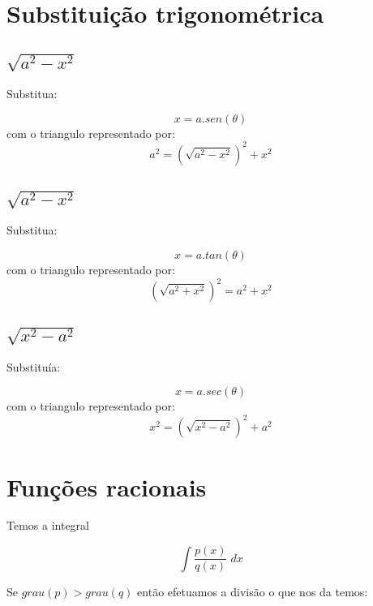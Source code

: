 \documentclass[14pt]{extreport}
\theoremstyle{definition}
\begin{document}
\section{Substituição trigonométrica}

\subsection{\(\sqrt{a^2 - x^2}\)}
Substitua:

\begin{equation}
    x = a.sen(\theta)
\end{equation}
com o triangulo representado por:
\begin{equation}
    a^2 = (\sqrt{a^2 - x^2})^2 + x^2
\end{equation}

\subsection{\(\sqrt{a^2 - x^2}\)}
Substitua:

\begin{equation}
    x = a.tan(\theta)
\end{equation}
com o triangulo representado por:
\begin{equation}
    (\sqrt{a^2 + x^2})^2 = a^2 + x^2
\end{equation}

\subsection{\(\sqrt{x^2 - a^2}\)}
Substituía:

\begin{equation}
    x = a.sec(\theta)
\end{equation}
com o triangulo representado por:
\begin{equation}
    x^2 = (\sqrt{x^2 - a^2})^2 + a^2 
\end{equation}


\section{Funções racionais}

Temos a integral 

\begin{equation}
    \int \frac{p(x)}{q(x)}\; dx
\end{equation}

Se \(grau(p) > grau(q)\) então efetuamos a divisão o que nos da temos:
\end{document}
